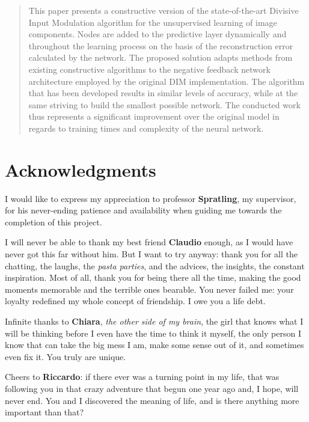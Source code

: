 \documentclass[11pt,a4paper]{report}
\begin{document}
	
	
	
	\begin{abstract}
		This paper presents a constructive version of the state-of-the-art Divisive Input Modulation algorithm for the unsupervised learning of image components. Nodes are added to the predictive layer dynamically and throughout the learning process on the basis of the reconstruction error calculated by the network. The proposed solution adapts methods from existing constructive algorithms to the negative feedback network architecture employed by the original DIM implementation. The algorithm that has been developed results in similar levels of accuracy, while at the same striving to build the smallest possible network. The conducted work thus represents a significant improvement over the original model in regards to training times and complexity of the neural network.
	\end{abstract}
	
	
	\chapter*{Acknowledgments}
	I would like to express my appreciation to professor \textbf{Spratling}, my supervisor, for his never-ending patience and availability when guiding me towards the completion of this project.
	
	I will never be able to thank my best friend \textbf{Claudio} enough, as I would have never got this far without him. But I want to try anyway: thank you for all the chatting, the laughs, the \emph{pasta parties}, and the advices, the insights, the constant inspiration. Most of all, thank you for being there all the time, making the good moments memorable and the terrible ones bearable. You never failed me: your loyalty redefined my whole concept of friendship. I owe you a life debt.
	
	Infinite thanks to \textbf{Chiara}, \emph{the other side of my brain}, the girl that knows what I will be thinking before I even have the time to think it myself, the only person I know that can take the big mess I am, make some sense out of it, and sometimes even fix it. You truly are unique.
	
	Cheers to \textbf{Riccardo}: if there ever was a turning point in my life, that was following you in that crazy adventure that begun one year ago and, I hope, will never end. You and I discovered the meaning of life, and is there anything more important than that?
	
\end{document}
